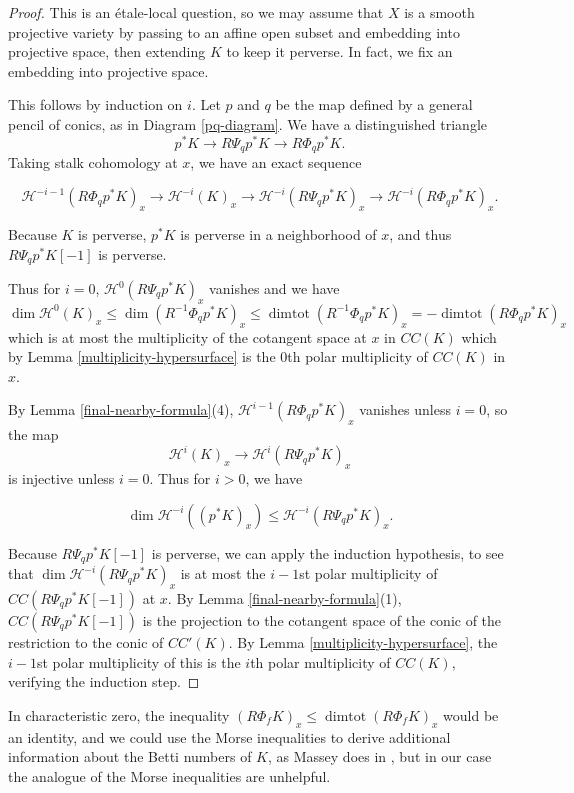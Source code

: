 \documentclass[12pt]{amsart}
\theoremstyle{definition}
\theoremstyle{remark}
\begin{document}
\begin{proof} This is an \'{e}tale-local question, so we may assume that $X$ is a smooth projective variety by passing to an affine open subset and embedding into projective space, then extending $K$ to keep it perverse. In fact, we fix an embedding into projective space. 

This follows by induction on $i$. Let $p$ and $q$ be the map defined by a general pencil of conics, as in Diagram \ref{pq-diagram}. We have a distinguished triangle \[ p^* K \to  R \Psi_q p^* K \to R \Phi_q p^*  K  .\] Taking stalk cohomology at $x$, we have an exact sequence

\[ \mathcal H^{-i-1}( R \Phi_q p^*  K)_x \to \mathcal H^{-i} ( K)_x \to \mathcal H^{-i} ( R \Psi_q p^* K)_x \to  \mathcal H^{-i}( R \Phi_q p^*  K)_x .\]


Because $K$ is perverse, $p^*K$ is perverse in a neighborhood of $x$, and thus $R \Psi_q p^* K[-1]$ is perverse.

Thus for $i=0$, $ \mathcal H^0 ( R \Psi_q p^* K)_x $ vanishes and we have
\[ \dim \mathcal H^0(K)_x \leq \dim  (R^{-1}\Phi_q p^*K)_x \leq \operatorname{dimtot} (R^{-1}  \Phi_q p^* K)_x = -  \operatorname{dimtot} (R \Phi_q p^* K)_x \] which is at most the multiplicity of the cotangent space at $x$ in $CC(K)$ which by Lemma \ref{multiplicity-hypersurface} is the $0$th polar multiplicity of $CC(K)$ in $x$.


By Lemma \ref{final-nearby-formula}(4), $\mathcal H^{i-1}( R \Phi_q p^*  K)_x$ vanishes unless $i=0$, so the map \[ \mathcal H^i ( K)_x \to \mathcal H^i ( R \Psi_q p^* K)_x \] is injective unless $i=0$. Thus for $i>0 $, we have

\[ \dim \mathcal H^{-i} ( (p^*K)_x)  \leq \mathcal H^{-i} ( R \Psi_q p^* K)_x. \]

Because $R \Psi_q p^* K [-1]$ is perverse, we can apply the induction hypothesis, to see that $\dim  \mathcal H^{-i} ( R \Psi_q p^* K)_x$  is at most the $i-1$st polar multiplicity of $CC( R \Psi_q p^* K [-1])$ at $x$. By Lemma \ref{final-nearby-formula}(1), $CC( R \Psi_q p^* K [-1])$ is the projection to the cotangent space of the conic of the restriction to the conic of $CC'(K)$. By Lemma \ref{multiplicity-hypersurface}, the $i-1$st polar multiplicity of this is the $i$th polar multiplicity of $CC(K)$, verifying the induction step.\end{proof}

In characteristic zero, the inequality $(R\Phi_f K)_x \leq \operatorname{dimtot} (R \Phi_f K)_x$ would be an identity, and we could use the Morse inequalities to derive additional information about the Betti numbers of $K$, as Massey does in \cite[Corollary 5.5]{Massey}, but in our case the analogue of the Morse inequalities are unhelpful.
\end{document}
